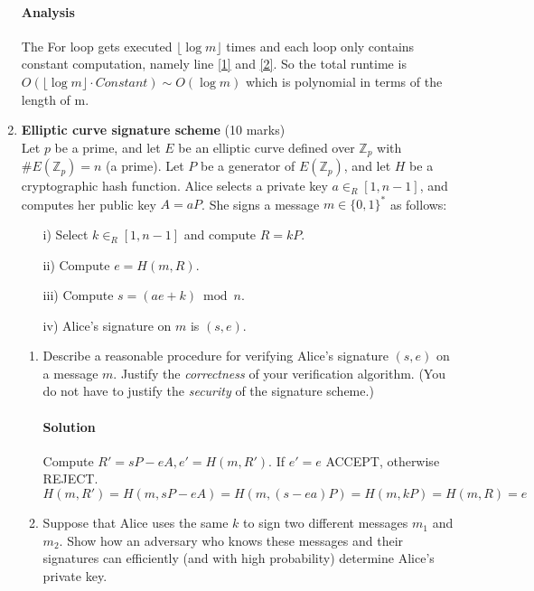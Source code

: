 \documentclass[11pt]{article}
\newcommand{\ZZ}{{\mathbb Z}}
\newcommand{\floor}[1]{\lfloor #1 \rfloor}
\begin{document}
\begin{enumerate}
\paragraph{Analysis} The For loop gets executed $\floor{\log m}$ times and each loop only contains constant computation, namely line \ref{1} and \ref{2}. So the total runtime is $O(\floor{\log m} \cdot Constant) \sim O(\log m)$ which is polynomial in terms of the length of m.

\newpage
\item {\bf Elliptic curve signature scheme} (10 marks)\\
Let $p$ be a prime, and let $E$ be an elliptic curve defined over $\ZZ_p$
with $\# E(\ZZ_p) = n$ (a prime). Let $P$ be a generator of $E(\ZZ_p)$,
and let $H$ be a cryptographic hash function. Alice
selects a private key $a \in_R [1,n-1]$, and computes her public key
$A = aP$. She signs a message $m \in \{0,1\}^*$ as follows:
\begin{itemize}
\itemsep 0mm
\item[i)] Select $k \in_R [1,n-1]$ and compute $R = kP$.
\item[ii)] Compute $e = H(m,R)$.
\item[iii)] Compute $s = (ae+k) \bmod{n}$.
\item[iv)] Alice's signature on $m$ is $(s,e)$.
\end{itemize}

\begin{enumerate}
\item Describe a reasonable procedure for verifying Alice's signature
      $(s,e)$ on a message $m$. Justify the \emph{correctness} of your
      verification algorithm. (You do not have to justify the \emph{security}
      of the signature scheme.)
      \paragraph{Solution}
      Compute $R'=sP-eA, e' = H(m, R')$. If $e'=e$ ACCEPT, otherwise REJECT.\\
      \[
      H(m, R')=H(m, sP-eA) = H(m, (s-ea)P) = H(m, kP) = H(m, R) = e
      \]
\item Suppose that Alice uses the same $k$ to sign two different messages
      $m_1$ and $m_2$. Show how an adversary who knows these messages and
      their signatures can efficiently (and with high probability) determine
      Alice's private key.

\end{enumerate}
\end{enumerate}
\end{document}

